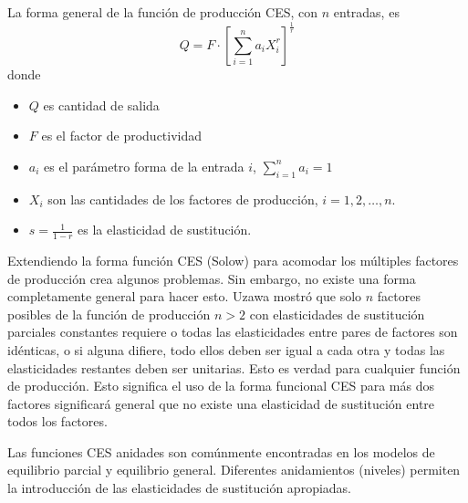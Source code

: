 \begin{definition}
\begin{itemize}
\end{itemize}
La forma general de la función de producción CES, con $n$ entradas, es
\begin{equation}
Q=F\cdot{\left[\sum_{i=1}^{n}a_{i}X^{r}_{i}\right]}^{\frac{1}{r}}
\end{equation}
donde
\begin{itemize}
	\item $Q$ es cantidad de salida
	\item $F$ es el factor de productividad
	\item $a_{i}$ es el parámetro forma de la entrada $i$, $\sum_{i=1}^{n}a_{i}=1$
	\item $X_{i}$ son las cantidades de los factores de producción, $i=1,2,\ldots,n$.
	\item $s=\frac{1}{1-r}$ es la elasticidad de sustitución.
\end{itemize}
\end{definition}
Extendiendo la forma función CES (Solow) para acomodar los múltiples factores de producción crea algunos problemas. Sin embargo, no existe una forma completamente general para hacer esto. Uzawa mostró que solo $n$ factores posibles de la función de producción $n>2$ con elasticidades de sustitución parciales constantes requiere o todas las elasticidades entre pares de factores son idénticas, o si alguna difiere, todo ellos deben ser igual a cada otra y todas las elasticidades restantes deben ser unitarias. Esto es verdad para cualquier función de producción. Esto significa el uso de la forma funcional CES para más dos factores significará general que no existe una elasticidad de sustitución entre todos los factores.

Las funciones CES anidades son comúnmente encontradas en los modelos de equilibrio parcial y equilibrio general. Diferentes anidamientos (niveles) permiten la introducción de las elasticidades de sustitución apropiadas.

